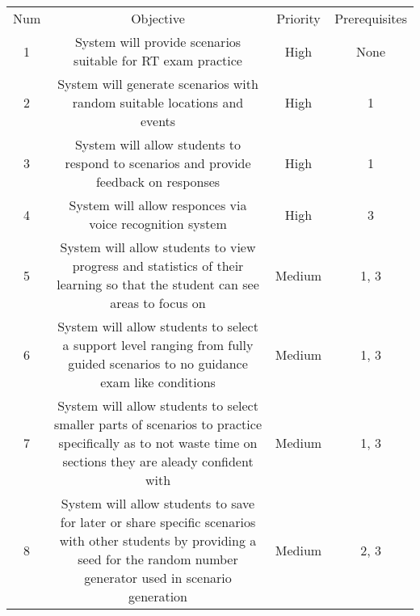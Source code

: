 \begin{center}
    \begin{tabular}{ | c | c | c | c | }
        Num & Objective & Priority & Prerequisites \\
        1 & System will provide scenarios suitable for RT exam practice & High & None \\
        2 & System will generate scenarios with random suitable locations and events & High & 1 \\
        3 & System will allow students to respond to scenarios and provide feedback on responses & High & 1 \\
        4 & System will allow responces via voice recognition system & High & 3 \\
        5 & System will allow students to view progress and statistics of their learning so that the student can see areas to focus on & Medium & 1, 3 \\
        6 & System will allow students to select a support level ranging from fully guided scenarios to no guidance exam like conditions & Medium & 1, 3 \\
        7 & System will allow students to select smaller parts of scenarios to practice specifically as to not waste time on sections they are aleady confident with & Medium & 1, 3 \\
        8 & System will allow students to save for later or share specific scenarios with other students by providing a seed for the random number generator used in scenario generation & Medium & 2, 3 \\
    \end{tabular}
\end{center}